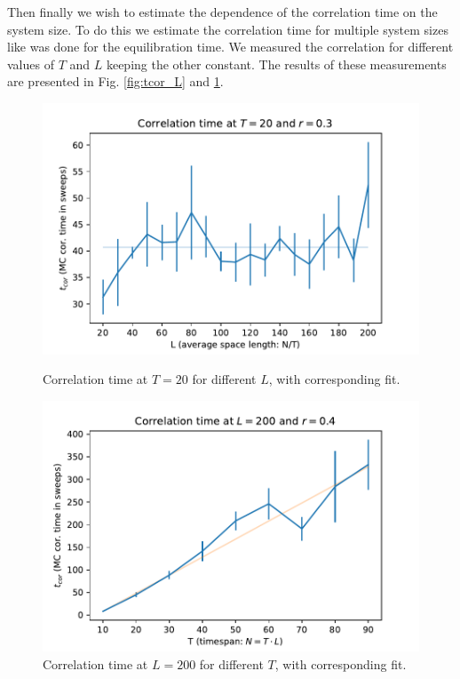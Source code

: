 Then finally we wish to estimate the dependence of the correlation time on the system size. To do this we estimate the correlation time for multiple system sizes like was done for the equilibration time.
We measured the correlation for different values of $T$ and $L$ keeping the other constant. The results of these measurements are presented in Fig. \ref{fig:tcor_L} and \ref{fig:tcor_T}.
\begin{figure}
    \centering
    \begin{minipage}{0.48\linewidth}
        \centering
        \includegraphics[width=1.0\linewidth]{img/tcor_l_t20_r0.3.pdf}
        \caption{Correlation time at $T = 20$ for different $L$, with corresponding fit.}
        \label{fig:tcor_L}
    \end{minipage}
    \hfill
    \begin{minipage}{0.48\linewidth}
        \centering
        \includegraphics[width=1.0\linewidth]{img/tcor_t_l200_r0.4.pdf}
        \caption{Correlation time at $L = 200$ for different $T$, with corresponding fit.}
        \label{fig:tcor_T}
    \end{minipage}
\end{figure}
